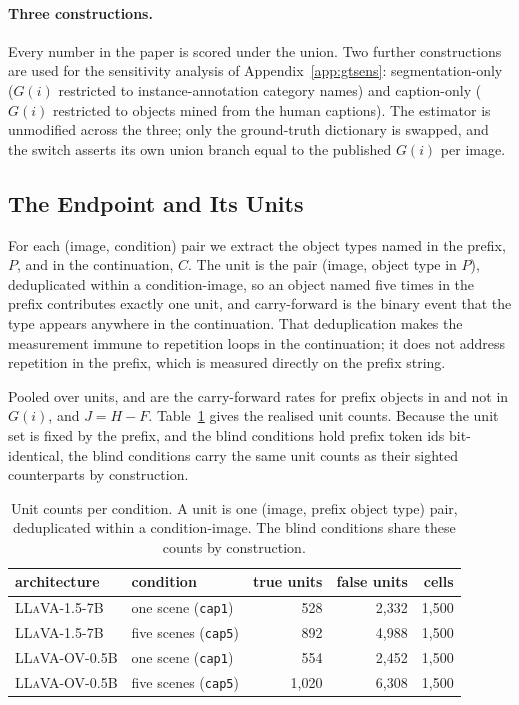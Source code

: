 \paragraph{Three constructions.} Every number in the paper is scored under the union. Two further
constructions are used for the sensitivity analysis of Appendix~\ref{app:gtsens}: segmentation-only
($G(i)$ restricted to instance-annotation category names) and caption-only ($G(i)$ restricted to
objects mined from the human captions). The estimator is unmodified across the three; only the
ground-truth dictionary is swapped, and the switch asserts its own union branch equal to the
published $G(i)$ per image.

\subsection{The Endpoint and Its Units}
\label{app:endpoint}

For each (image, condition) pair we extract the object types named in the prefix, $P$, and in the
continuation, $C$. The unit is the pair (image, object type in $P$), deduplicated within a
condition-image, so an object named five times in the prefix contributes exactly one unit, and
carry-forward is the binary event that the type appears anywhere in the continuation. That
deduplication makes the measurement immune to repetition loops in the continuation; it does not
address repetition in the prefix, which is measured directly on the prefix string.

Pooled over units, \rateT{} and \rateF{} are the carry-forward rates for prefix objects in and not in
$G(i)$, and $J = H - F$. Table~\ref{tab:units} gives the realised unit counts.
Because the unit set is fixed by the prefix, and the blind conditions hold prefix token ids
bit-identical, the blind conditions carry the same unit counts as their sighted counterparts by
construction.

\begin{table}[htb]
\caption{Unit counts per condition. A unit is one (image, prefix object type) pair, deduplicated
within a condition-image. The blind conditions share these counts by construction.}
\label{tab:units}
\begin{center}
\small
\begin{tabular}{llrrr}
\toprule
architecture & condition & true units & false units & cells \\
\midrule
\textsc{LLaVA-1.5-7B} & one scene (\texttt{cap1}) & 528 & 2{,}332 & 1{,}500 \\
\textsc{LLaVA-1.5-7B} & five scenes (\texttt{cap5}) & 892 & 4{,}988 & 1{,}500 \\
\textsc{LLaVA-OV-0.5B} & one scene (\texttt{cap1}) & 554 & 2{,}452 & 1{,}500 \\
\textsc{LLaVA-OV-0.5B} & five scenes (\texttt{cap5}) & 1{,}020 & 6{,}308 & 1{,}500 \\
\bottomrule
\end{tabular}
\end{center}
\end{table}

